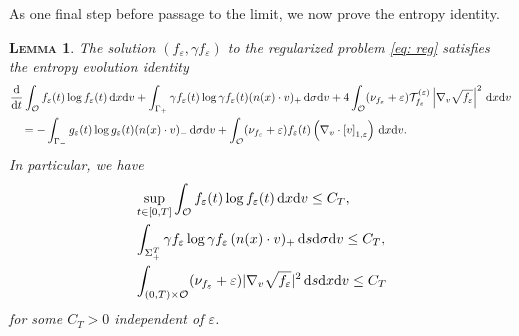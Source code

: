 \documentclass[10pt, reqno]{amsart}
\theoremstyle{plain}
\newtheorem{lemma}[theorem]{\normalfont \scshape Lemma}
\theoremstyle{definition}
\theoremstyle{remark}
\numberwithin{equation}{section}
\newcommand{\calO}{\mathcal O}
\newcommand{\calT}{\mathcal T}
\newcommand{\ve}{\varepsilon}
\newcommand{\dx}{\textnormal{d}x}
\newcommand{\dv}{\textnormal{d}v}
\newcommand{\ds}{\textnormal{d}s}
\newcommand{\ddt}{\frac{\textnormal{d}}{\textnormal{d}t}}
\newcommand{\tnd}{\textnormal{d}}
\newcommand{\lt}{\left}
\newcommand{\rt}{\right}
\newcommand{\renorm}[3]{\lt[#1\rt]_{#2 , #3}}
\begin{document}
As one final step before passage to the limit, we now prove the entropy identity.

\begin{lemma} \label{lem: entropy}
    The solution $(f_\ve,\gamma f_\ve)$ to the regularized problem \eqref{eq: reg} satisfies the entropy evolution identity
    \begin{align*}
        &\ddt \int_{\calO} f_\ve(t) \log f_\ve(t) \,\dx\dv + \int_{\Gamma_+} \gamma f_\ve(t) \log \gamma f_\ve(t) (n(x)\cdot v)_+ \,\tnd\sigma\dv + 4 \int_{\calO} (\nu_{f_\ve} + \ve) \calT_{f_\ve}^{(\ve)} \lt|\nabla_v\sqrt{f_\ve}\rt|^2 \,\dx\dv \\
        &\quad = - \int_{\Gamma_-} g_\ve(t) \log g_\ve(t) (n(x)\cdot v)_- \,\tnd\sigma\dv  +  \int_{\calO} (\nu_{f_\ve} + \ve) f_\ve(t) \lt(\nabla_v\cdot \renorm{v}{1}{\ve} \rt) \,\dx\dv.
    \end{align*}
    In particular, we have
    \begin{align*}
        &\sup_{t\in [0,T]} \int_{\calO} f_\ve(t) \log f_\ve(t) \,\dx\dv \le C_T, \\
        &\int_{\Sigma_+^T} \gamma f_\ve \log \gamma f_\ve \, (n(x)\cdot v)_+ \,\ds\tnd\sigma\dv \le C_T , \\
        &\int_{(0,T)\times \calO} (\nu_{f_\ve} + \ve) |\nabla_v \sqrt{f_\ve}|^2 \,\ds\dx\dv \le C_T
    \end{align*}
    for some $C_T>0$ independent of $\ve$.
\end{lemma}
\end{document}
